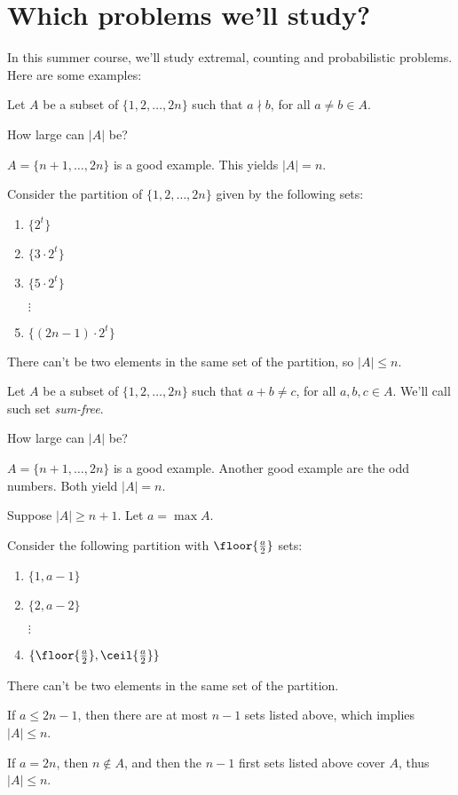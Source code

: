 \section{Which problems we'll study?}

In this summer course, we'll study extremal, counting and probabilistic problems. Here are some examples:

\begin{prob}
	Let $A$ be a subset of $\{1, 2, \dots, 2n\}$ such that $a \nmid b$, for all $a \neq b \in A$.

	How large can $|A|$ be?
\end{prob}

\begin{sol}
	$A = \{n+1, \dots, 2n\}$ is a good example. This yields $|A| = n$.

	Consider the partition of $\{1, 2, \dots, 2n\}$ given by the following sets:
	\begin{enumerate}[label = \textbullet]
		\item $\{2^t\}$
		\item $\{3 \cdot 2^t\}$
		\item $\{5 \cdot 2^t\}$
		\item[$\vdots$]
		\item $\{(2n-1) \cdot 2^t\}$
	\end{enumerate}

	There can't be two elements in the same set of the partition, so $|A| \le n$. 
\end{sol}

\begin{prob}
	Let $A$ be a subset of $\{1, 2, \dots, 2n\}$ such that $a + b \neq c$, for all $a, b, c \in A$. We'll call such set \emph{sum-free}.

	How large can $|A|$ be?
\end{prob}

\begin{sol}	
	$A = \{n+1, \dots, 2n\}$ is a good example. Another good example are the odd numbers. Both yield $|A| = n$.

	Suppose $|A| \ge n+1$. Let $a = \max A$.

	Consider the following partition with $\floor{\frac{a}{2}}$ sets:
	\begin{enumerate}[label = \textbullet]
		\item $\{1, a-1\}$
		\item $\{2, a-2\}$
		\item[$\vdots$]
		\item $\{\floor{\frac{a}{2}}, \ceil{\frac{a}{2}}\}$
	\end{enumerate}

	There can't be two elements in the same set of the partition.

	If $a \le 2n-1$, then there are at most $n - 1$ sets listed above, which implies $|A| \le n$.

	If $a = 2n$, then $n \not\in A$, and then the $n-1$ first sets listed above cover $A$, thus $|A| \le n$.
\end{sol}

